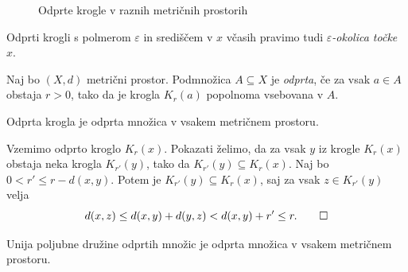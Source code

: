 \documentclass{isrmdelo}
\begin{document}
\begin{figure}[h!]  
\centering 
{}
\bigskip
\caption{Odprte krogle v raznih metričnih prostorih} \label{fig:krogle}  
\end{figure} 

\begin{opomba}
Odprti krogli s polmerom $\varepsilon$ in središčem v $x$ včasih pravimo tudi \emph{$\varepsilon$-okolica točke $x$}.
\end{opomba}

\begin{definicija}
Naj bo $(X,d)$ metrični prostor. Podmnožica $A \subseteq X$ je \emph{odprta}, če za vsak $a \in A$ obstaja $r > 0$, tako da je krogla $K_r(a)$ popolnoma vsebovana v $A$.
\end{definicija}

\begin{trditev}
Odprta krogla je odprta množica v vsakem metričnem prostoru.
\end{trditev}

\begin{dokaz}
Vzemimo odprto kroglo $K_r(x)$. Pokazati želimo, da za vsak $y$ iz krogle $K_r(x)$ obstaja neka krogla $K_{r'}(y)$, tako da $K_{r'}(y) \subseteq K_r(x)$. Naj bo $0 < r' \leq r - d(x,y).$ Potem je $K_{r'}(y) \subseteq K_r(x)$, saj za vsak $z \in K_{r'}(y)$ velja 
\begin{equation*}
d(x,z) \leq d(x,y) + d(y,z) < d(x,y) + r' \leq r. \qedhere
\end{equation*}
\end{dokaz}

\begin{trditev}
\label{trditev:metrika_unija}
Unija poljubne družine odprtih množic je odprta množica v vsakem metričnem prostoru.
\end{trditev}
\end{document}
